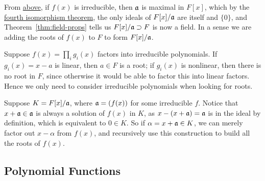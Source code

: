 \begin{remark}
    From \hyperref[thm:ideal-divisibility]{above},
    if \(f(x)\) is irreducible, then \(\mathfrak{a}\) is maximal in \(F[x]\),
    which by the \hyperref[thm:iso-4-ring]{fourth isomorphism theorem},
    the only ideals of \(F[x]/\mathfrak{a}\) are itself and \(\{0\}\),
    and Theorem~\ref{thm:field-props} tells us \(F[x]/\mathfrak{a} \supset F\) is now a field.
    In a sense we are adding the roots of \(f(x)\) to \(F\) to form \(F[x]/\mathfrak{a}\).

    Suppose \(f(x) = \prod_i g_i(x)\) factors into irreducible polynomials.
    If \(g_i(x) = x-a\) is linear, then \(a \in F\) is a root;
    if \(g_i(x)\) is nonlinear, then there is no root in \(F\),
    since otherwise it would be able to factor this into linear factors.
    Hence we only need to consider irreducible polynomials
    when looking for roots.

    Suppose \(K = F[x]/\mathfrak{a}\), where \(\mathfrak{a} = (f(x))\) for some irreducible \(f\).
    Notice that \(x+\mathfrak{a} \in \mathfrak{a}\) is always a solution of \(f(x)\) in \(K\),
    as \(x-(x+\mathfrak{a}) = \mathfrak{a}\) is in the ideal by definition,
    which is equivalent to \(0 \in K\).
    So if \(\alpha = x+\mathfrak{a} \in K\),
    we can merely factor out \(x-\alpha\) from \(f(x)\),
    and recursively use this construction to build all the roots of \(f(x)\).
\end{remark}

\subsection*{Polynomial Functions}

